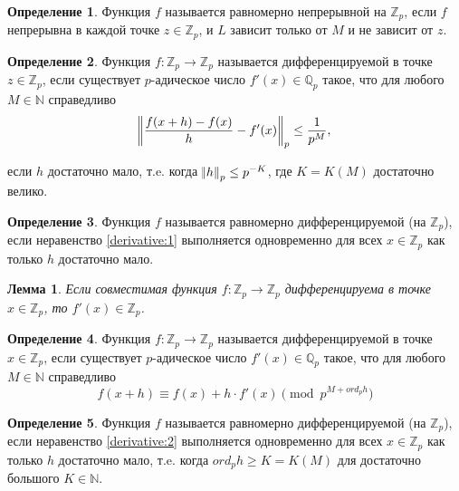 \documentclass[master, och, diploma, times]{sty/SCWorks}
\theoremstyle{plain}
\newtheorem{lemma}{Лемма}[section]
\theoremstyle{definition}
\newtheorem{defn}{Определение}[section]
\begin{document}
\begin{defn}
Функция $f$ называется равномерно непрерывной на $\mathbb {Z}_p$, если $f$ непрерывна в каждой точке $z \in \mathbb {Z}_p$, и $L$ зависит только от $M$ и не зависит от $z$.\cite{bib:analysis:ciocan}
\end{defn}


\begin{defn}
Функция $f:\mathbb {Z}_p \rightarrow \mathbb {Z}_p$ называется дифференцируемой в точке $z \in \mathbb {Z}_p$, если существует $p$-адическое число $f'(x) \in \mathbb {Q}_p$ такое, что для любого $M \in \mathbb {N}$ справедливо
\begin{equation} \label{derivative:1}
	\norm{\frac{f(x+h)-f(x)}{h} - f'(x)}_p \le \frac{1}{p^M},
\end{equation}

\noindent если $h$ достаточно мало, т.e. когда $\norm{h}_p \le p^{-K}$, где $K=K(M)$ достаточно велико.
\end{defn}

\begin{defn}
Функция $f$ называется равномерно дифференцируемой (на $\mathbb {Z}_p$), если неравенство \eqref{derivative:1} выполняется одновременно для всех $x \in \mathbb {Z}_p$ как только $h$ достаточно мало. \cite{bib:analysis:anashin:en}
\end{defn}

\begin{lemma}
Если совместимая функция $f:\mathbb {Z}_p \rightarrow \mathbb {Z}_p$ дифференцируема в точке $x \in \mathbb {Z}_p$, то $f'(x) \in \mathbb {Z}_p$.
\end{lemma}

\begin{defn}
Функция $f:\mathbb {Z}_p \rightarrow \mathbb {Z}_p$ называется дифференцируемой в точке $x \in \mathbb {Z}_p$, если существует $p$-адическое число $f'(x) \in \mathbb {Q}_p$ такое, что для любого $M \in \mathbb {N}$ справедливо
\begin{equation} \label{derivative:2}
	f(x+h) \equiv f(x) + h \cdot f'(x) \pmod p^{M + ord_p h}
\end{equation}
\end{defn}

\begin{defn}
Функция $f$ называется равномерно дифференцируемой (на $\mathbb {Z}_p$), если неравенство \eqref{derivative:2} выполняется одновременно для всех $x \in \mathbb {Z}_p$ как только $h$ достаточно мало, т.e. когда $ord_p h \ge K=K(M)$ для достаточно большого $K \in \mathbb {N}$.
\end{defn}
\end{document}
